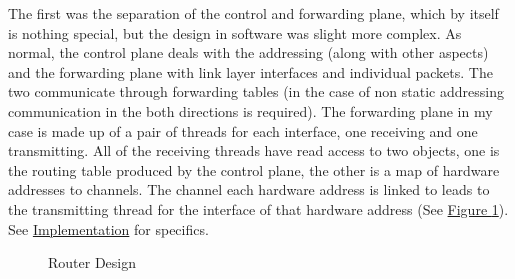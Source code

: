 \documentclass[12pt,a4paper,twoside,openright]{report}
\begin{document}
\bigskip

The first was the separation of the control and forwarding plane, which by itself is nothing special, but the design in software was slight more complex.  As normal, the control plane deals with the addressing (along with other aspects) and the forwarding plane with link layer interfaces and individual packets.  The two communicate through forwarding tables (in the case of non static addressing communication in the both directions is required). The forwarding plane in my case is made up of a pair of threads for each interface, one receiving and one transmitting. All of the receiving threads have read access to two objects, one is the routing table produced by the control plane, the other is a map of hardware addresses to channels.  The channel each hardware address is linked to leads to the transmitting thread for the interface of that hardware address (See \hyperref[fig::router_design]{Figure }\ref{fig::router_design}). See \hyperref[chap::implementation]{Implementation} for specifics.

\begin{figure}
\centering
{}
\caption{Router Design}
\label{fig::router_design}
\end{figure}
\end{document}
